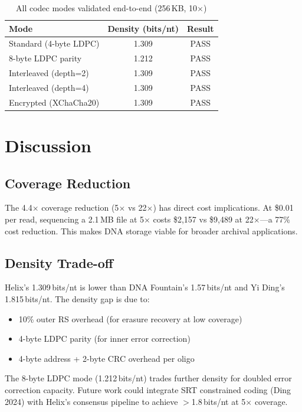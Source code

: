 \documentclass[11pt,a4paper]{article}
\begin{document}
\begin{table}[h]
\centering
\caption{All codec modes validated end-to-end (256\,KB, 10$\times$)}
\begin{tabular}{lcc}
\toprule
Mode & Density (bits/nt) & Result \\
\midrule
Standard (4-byte LDPC) & 1.309 & PASS \\
8-byte LDPC parity & 1.212 & PASS \\
Interleaved (depth=2) & 1.309 & PASS \\
Interleaved (depth=4) & 1.309 & PASS \\
Encrypted (XChaCha20) & 1.309 & PASS \\
\bottomrule
\end{tabular}
\end{table}

\section{Discussion}

\subsection{Coverage Reduction}

The 4.4$\times$ coverage reduction (5$\times$ vs 22$\times$) has direct cost implications. At \$0.01 per read, sequencing a 2.1\,MB file at 5$\times$ costs \$2,157 vs \$9,489 at 22$\times$---a 77\% cost reduction. This makes DNA storage viable for broader archival applications.

\subsection{Density Trade-off}

Helix's 1.309\,bits/nt is lower than DNA Fountain's 1.57\,bits/nt and Yi Ding's 1.815\,bits/nt. The density gap is due to:
\begin{itemize}[noitemsep]
\item 10\% outer RS overhead (for erasure recovery at low coverage)
\item 4-byte LDPC parity (for inner error correction)
\item 4-byte address + 2-byte CRC overhead per oligo
\end{itemize}

The 8-byte LDPC mode (1.212\,bits/nt) trades further density for doubled error correction capacity. Future work could integrate SRT constrained coding (Ding 2024) with Helix's consensus pipeline to achieve $>$1.8\,bits/nt at 5$\times$ coverage.
\end{document}
